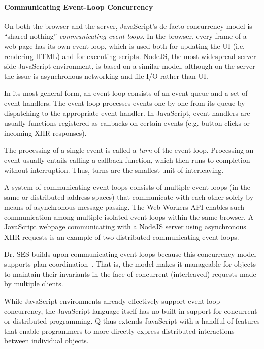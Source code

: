 \documentclass{llncs}
\begin{document}
\paragraph{Communicating Event-Loop Concurrency}

On both the browser and the server, JavaScript's de-facto concurrency model is ``shared nothing'' \emph{communicating event loops}. In the browser, every frame of a web page has its own event loop, which is used both for updating the UI (i.e. rendering HTML) and for executing scripts. NodeJS, the most widespread server-side JavaScript environment, is based on a similar model, although on the server the issue is asynchronous networking and file I/O rather than UI.

In its most general form, an event loop consists of an event queue and a set of event handlers. The event loop processes events one by one from its queue by dispatching to the appropriate event handler. In JavaScript, event handlers are usually functions registered as callbacks on certain events (e.g. button clicks or incoming XHR responses).

The processing of a single event is called a \emph{turn} of the event loop. Processing an event usually entails calling a callback function, which then runs to completion without interruption. Thus, turns are the smallest unit of interleaving.

A system of communicating event loops consists of multiple event loops (in the same or distributed address spaces) that communicate with each other solely by means of asynchronous message passing. The Web Workers API enables such communication among multiple isolated event loops within the same browser. A JavaScript webpage communicating with a NodeJS server using asynchronous XHR requests is an example of two distributed communicating event loops.

Dr. SES builds upon communicating event loops because this concurrency model supports plan coordination~\cite{miller:strangers}. That is, the model makes it manageable for objects to maintain their invariants in the face of concurrent (interleaved) requests made by multiple clients.

While JavaScript environments already effectively support event loop concurrency, the JavaScript language itself has no built-in support for concurrent or distributed programming. Q thus extends JavaScript with a handful of features that enable programmers to more directly express distributed interactions between individual objects.
\end{document}
